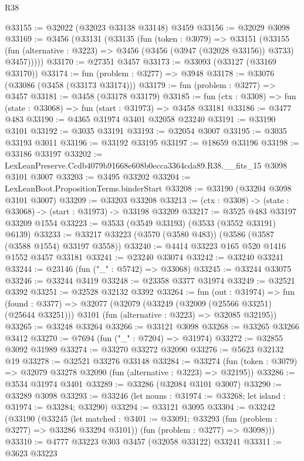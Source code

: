 \begin{lexlean}{R38}
\begin{coremodule}
@33155 := @32022 (@32023 @33138 @33148) @3459
@33156 := @32029 @3098
@33169 := @3456
    (@33131
      (@33135
        (fun (token : @3079) =>
        @33151
          (@33155
            (fun (alternative : @3223) => @3456 (@3456 (@3947 (@32028 @33156)) @3733) @3457)))))
@33170 := @27351 @3457
@33173 := @33093 (@33127 (@33169 @33170))
@33174 := fun (problem : @3277) => @3948
@33178 := @33076 (@33086 (@3458 (@33173 @33174)))
@33179 := fun (problem : @3277) => @3457
@33181 := @3458 (@33178 @33179)
@33185 := fun (ctx : @3308) => fun (state : @33068) => fun (start : @31973) => @3458 @33181
@33186 := @3477 @483
@33190 := @4365 @31974 @3401 @32058 @23240
@33191 := @33190 @3101
@33192 := @3035 @33191
@33193 := @32054 @3007
@33195 := @3035 @33193 @3011
@33196 := @33192 @33195
@33197 := @18659 @33196
@33198 := @33186 @33197
@33202 := LexLeanPreserve.Ccdb4079b91668e608b0ecca3364cda89.R38.__fits_15 @3098 @3101 @3007
@33203 := @3495 @33202
@33204 := LexLeanBoot.PropositionTerms.binderStart
@33208 := @33190 (@33204 @3098 @3101 @3007)
@33209 := @33203 @33208
@33213 := (ctx : @3308) -> (state : @33068) -> (start : @31973) -> @33198 @33209
@33217 := @3525 @483 @33197 @33209 @1554
@33223 := @3533 (@3549 @33193) (@3533 (@3552 @33191) @6139)
@33233 := @33217 @33223 (@3570 (@3580 @483)) (@3586 (@3587 (@3588 @1554) @33197 @3558))
@33240 := @4414 @33223 @165 @520 @1416 @1552 @3457 @33181
@33241 := @23240 @33074
@33242 := @33240 @33241
@33244 := @23146 (fun ("_" : @5742) => @33068)
@33245 := @33244 @33075
@33246 := @33244 @3419
@33248 := @23358 @3377 @31974
@33249 := @32521 @3392
@33251 := @32528 @32132 @3392
@33264 := fun (out : @31974) =>
  fun (found : @3377) =>
  @32077
    (@32079
      (@33249 (@32009 (@25566 @33251) (@25644 @33251)))
      @3101
      (fun (alternative : @3223) => @32085 @32195))
@33265 := @33248 @33264
@33266 := @33121 @3098
@33268 := @33265 @33266 @3412
@33270 := @7694 (fun ("_" : @7204) => @31974)
@33272 := @32855 @3092 @31989
@33274 := @33270 @33272 @32090
@33276 := @5623 @32132 @19
@33278 := @32521 @33276 @33148
@33284 := @33274 (fun (token : @3079) => @32079 @33278 @32090 (fun (alternative : @3223) => @32195))
@33286 := @3534 @31974 @3401
@33289 := @33286 (@32084 @3101 @3007)
@33290 := @33289 @3098
@33293 := @33246 (let nouns : @31974 := @33268; let island : @31974 := @33284; @33290)
@33294 := @33121 @3095
@33304 := @33242
    (@33190
      (@33245
        (let matched : @3401 := @33091; @33293 (fun (problem : @3277) => @33286 @33294 @3101))
        (fun (problem : @3277) => @3098)))
@33310 := @4777 @33223 @303 @3457 (@32058 @33122) @33241
@33311 := @3623 @33223

\end{coremodule}
\end{lexlean}
